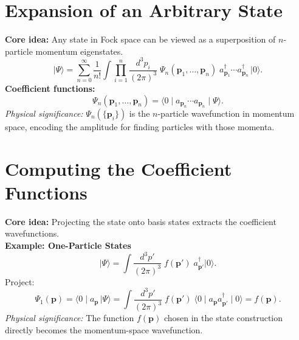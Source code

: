 \documentclass[11pt]{article}
\numberwithin{equation}{section}
\begin{document}
\section{Expansion of an Arbitrary State}
\textbf{Core idea:} Any state in Fock space can be viewed as a superposition of 
$n$-particle momentum eigenstates. \\
\begin{equation}
  \lvert\Psi\rangle = \sum_{n=0}^\infty \frac{1}{n!} \int\!\prod_{i=1}^n\frac{d^3p_i}{(2\pi)^3}\; \Psi_n(\mathbf p_1, \dots, \mathbf p_n)\; a^\dagger_{\mathbf p_1}\cdots a^\dagger_{\mathbf p_n}\,\lvert0\rangle.
\end{equation}
\textbf{Coefficient functions:}
\begin{equation}
  \Psi_n(\mathbf p_1, \dots, \mathbf p_n) = \langle0\mid a_{\mathbf p_n}\cdots
  a_{\mathbf p_n}\mid\Psi\rangle.
\end{equation}
\textit{Physical significance:} $\Psi_n(\{\mathbf p_i\})$ is the $n$-particle wavefunction in momentum space, encoding the amplitude for finding particles with those momenta.
\\[1em]

\section{Computing the Coefficient Functions}
\textbf{Core idea:} Projecting the state onto basis states extracts the coefficient wavefunctions. \\[1em]
\textbf{Example:  One-Particle States}
\begin{equation}
   \lvert\Psi\rangle = \int \! \frac{d^3p'}{(2\pi)^3}\; f(\mathbf p')\; 
   a_{\mathbf p'}^\dagger\lvert0\rangle.
\end{equation}
Project:
\begin{equation}
   \Psi_1(\mathbf p) 
   = \langle0\mid a_{\mathbf p}\, \lvert\Psi\rangle 
   = \int \! \frac{d^3p'}{(2\pi)^3}\; f(\mathbf p')\; \langle0\mid a_{\mathbf p} 
     a_{\mathbf p'}^\dagger \mid0\rangle 
   = f(\mathbf p).
\end{equation}
\textit{Physical significance:} The function $f(\mathbf p)$ chosen in the state construction directly becomes the momentum-space wavefunction.
\\[1em]
\end{document}
